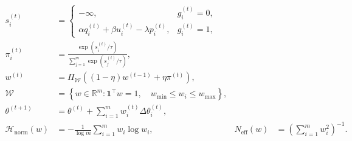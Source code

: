\begin{equation}
\begin{aligned}
s_i^{(t)}
&=
\begin{cases}
-\infty, & g_i^{(t)}=0,\\
\alpha q_i^{(t)}+\beta u_i^{(t)}-\lambda p_i^{(t)}, & g_i^{(t)}=1,
\end{cases} \\
\pi_i^{(t)}
&= \frac{\exp\!\left(s_i^{(t)}/\tau\right)}
{\sum_{j=1}^{m}\exp\!\left(s_j^{(t)}/\tau\right)}, \\
w^{(t)}
&= \Pi_{\mathcal{W}}\!\left((1-\eta)w^{(t-1)}+\eta\pi^{(t)}\right), \\
\mathcal{W}
&= \left\{w\in\mathbb{R}^{m}:
\mathbf{1}^{\top}w=1,\quad
w_{\min}\le w_i\le w_{\max}
\right\}, \\
\theta^{(t+1)}
&= \theta^{(t)}+\sum_{i=1}^{m}w_i^{(t)}\Delta\theta_i^{(t)}, \\
\mathcal{H}_{\mathrm{norm}}(w)
&= -\frac{1}{\log m}\sum_{i=1}^{m}w_i\log w_i,
&
N_{\mathrm{eff}}(w)
&= \left(\sum_{i=1}^{m}w_i^{2}\right)^{-1}.
\end{aligned}
\label{eq:fair-weights-h}
\end{equation}
